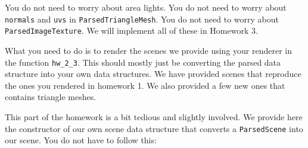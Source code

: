 You do not need to worry about area lights.
You do not need to worry about \lstinline{normals} and \lstinline{uvs} in \lstinline{ParsedTriangleMesh}.
You do not need to worry about \lstinline{ParsedImageTexture}.
We will implement all of these in Homework 3.

What you need to do is to render the scenes we provide using your renderer in the function \lstinline{hw_2_3}. This should mostly just be converting the parsed data structure into your own data structures. 
We have provided scenes that reproduce the ones you rendered in homework 1. 
We also provided a few new ones that contains triangle meshes.

This part of the homework is a bit tedious and slightly involved. We provide here the constructor of our own scene data structure that converts a \lstinline{ParsedScene} into our scene. You do not have to follow this:
